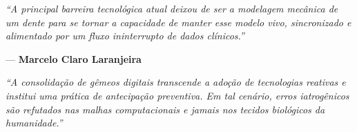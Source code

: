 \newpage
\thispagestyle{empty}
\vspace*{\fill}
\begin{flushright}
\begin{minipage}{0.6\textwidth}
\itshape\Large
``A principal barreira tecnológica atual deixou de ser a modelagem mecânica de um dente para se tornar a capacidade de manter esse modelo vivo, sincronizado e alimentado por um fluxo ininterrupto de dados clínicos.''

\vspace{0.5cm}
\raggedleft\normalfont--- \textbf{Marcelo Claro Laranjeira}

\vspace{1.5cm}

\itshape\Large
``A consolidação de gêmeos digitais transcende a adoção de tecnologias reativas e institui uma prática de antecipação preventiva. Em tal cenário, erros iatrogênicos são refutados nas malhas computacionais e jamais nos tecidos biológicos da humanidade.''
\end{minipage}
\end{flushright}
\vspace*{\fill}
